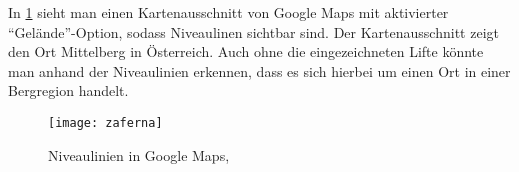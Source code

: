 In \cref{fig:zaferna} sieht man einen Kartenausschnitt von Google Maps\texttrademark{} mit aktivierter \enquote{Gelände}-Option, sodass Niveaulinen sichtbar sind.
Der Kartenausschnitt zeigt den Ort Mittelberg in Österreich.
Auch ohne die eingezeichneten Lifte könnte man anhand der Niveaulinien erkennen, dass es sich hierbei um einen Ort in einer Bergregion handelt.
\begin{figure}[hbtp]
	\centering
	\texttt{[image: zaferna]}
	\caption{Niveaulinien in Google Maps\texttrademark, \cite{googlemaps}}\label{fig:zaferna}
\end{figure}
